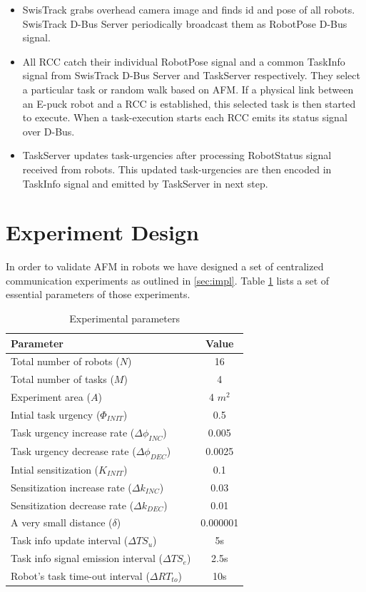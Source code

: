 \documentclass{llncs}
\begin{document}
\begin{itemize}
\item SwisTrack grabs overhead camera image and finds id and pose of all robots.  SwisTrack D-Bus Server periodically  broadcast them as RobotPose D-Bus signal.
\item All RCC catch their individual RobotPose signal and a common TaskInfo signal from SwisTrack D-Bus Server and TaskServer respectively. They select a particular task or random walk based on AFM. If a physical link between an E-puck robot and a RCC is established, this selected task is then started to execute. When a task-execution starts each RCC emits its status signal over D-Bus.
\item TaskServer updates task-urgencies after processing RobotStatus signal received from robots. This updated task-urgencies are then encoded in TaskInfo signal and emitted by TaskServer in next step.
\end{itemize}
\section{Experiment Design}
\label{sec:expt-design}
 In order to validate AFM in robots we have designed a set of centralized communication experiments as outlined in \ref{sec:impl}.  Table \ref{table:params} lists  a set of essential parameters of those experiments. 
\begin{table}
\caption{Experimental parameters}
\label{table:params}
\begin{center}
\begin{tabular}{|l||c|}
\hline Parameter & Value\\
\hline  Total number of robots ($N$) & 16\\
\hline  Total number of tasks ($M$) & 4\\
\hline  Experiment  area  ($A$) & 4 $m^2$\\
\hline Intial task urgency ($\Phi_{INIT}$) &  0.5\\
\hline Task urgency increase rate ($\Delta\phi_{INC}$) &  0.005\\
\hline Task urgency decrease rate ($\Delta\phi_{DEC}$) &  0.0025\\
\hline Intial sensitization ($K_{INIT}$) &  0.1\\
\hline Sensitization increase rate ($\Delta k_{INC}$) &  0.03\\
\hline Sensitization decrease rate ($\Delta k_{DEC}$) &  0.01\\
\hline  A very small distance ($\delta$)& 0.000001\\
\hline  Task info update interval ($\Delta TS_{u}$) & 5s\\
\hline  Task info signal emission interval ($ \Delta TS_{e}$)& 2.5s\\
\hline  Robot's task time-out interval ($\Delta RT_{to} $)& 10s\\
\hline
\end{tabular}
\end{center}
\end{table}
 
\end{document}
